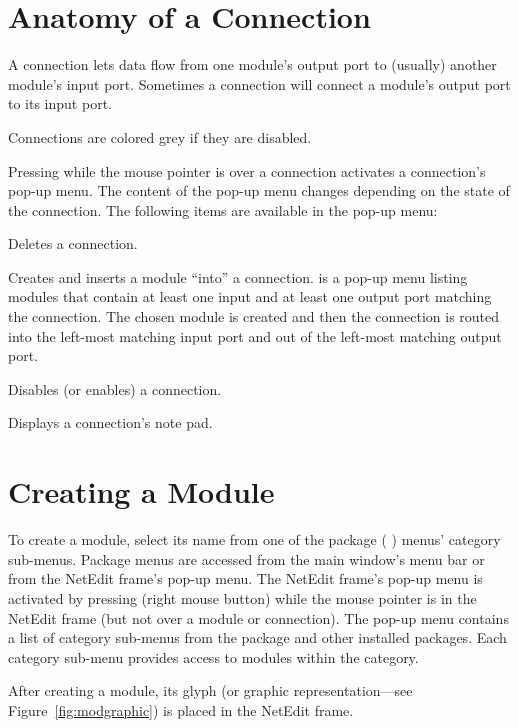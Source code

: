 \section{Anatomy of a Connection}
\label{sec:anatcon}

A connection lets data flow from one module's output port to (usually) another
module's input port.  Sometimes a connection will connect a module's
output port to its input port.

Connections are colored grey if they are disabled.

Pressing  while the mouse pointer is over a connection
activates a connection's pop-up menu.  The content of the pop-up menu
changes depending on the state of the connection. The following items are
available in the pop-up menu:

\begin{description}
   Deletes a connection.
  
   Creates and inserts a module ``into'' a
  connection.   is a pop-up menu listing modules
  that contain at least one input and at least one output port
  matching the connection.  The chosen module is created and then the
  connection is routed into the left-most matching input port and out
  of the left-most matching output port.
  
   Disables (or enables) a connection.
  
   Displays a connection's note pad.
\end{description}


\section{Creating a Module}
\label{sec:creatingmodules}

To create a module, select its name from one of the package (\eg{}
\sr) menus' category sub-menus. Package menus are accessed from the
main window's menu bar or from the NetEdit frame's pop-up menu.  The
NetEdit frame's pop-up menu is activated by pressing
 (right mouse button) while the mouse pointer is in
the NetEdit frame (but not over a module or connection).  The pop-up
menu contains a list of category sub-menus from the \sr{} package and
other installed packages.  Each category sub-menu provides access to
modules within the category.

After creating a module, its glyph (or graphic representation---see
Figure~\ref{fig:modgraphic}) is placed in the NetEdit frame.

